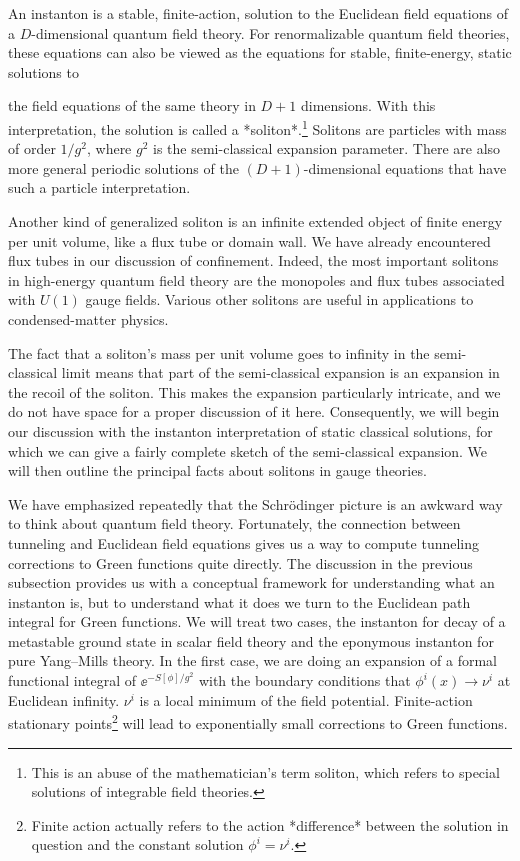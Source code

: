 An instanton is a stable, finite-action, solution to the Euclidean field
equations of a $D$-dimensional quantum field theory. For renormalizable quantum
field theories, these equations can also be viewed as the equations for stable,
finite-energy, static solutions to

the field equations of the same theory in $D+1$ dimensions. With this
interpretation, the solution is called a *soliton*.\footnote[5]{This is an
abuse of the mathematician's term soliton, which refers to special solutions of
integrable field theories.} Solitons are particles with mass of order $1/g^2$,
where $g^2$ is the semi-classical expansion parameter. There are also more
general periodic solutions of the $(D+1)$-dimensional equations that have such a
particle interpretation.

Another kind of generalized soliton is an infinite extended object of finite
energy per unit volume, like a flux tube or domain wall. We have already
encountered flux tubes in our discussion of confinement. Indeed, the most
important solitons in high-energy quantum field theory are the monopoles and
flux tubes associated with $U(1)$ gauge fields. Various other solitons are useful
in applications to condensed-matter physics.

The fact that a soliton's mass per unit volume goes to infinity in the
semi-classical limit means that part of the semi-classical expansion is an
expansion in the recoil of the soliton. This makes the expansion particularly
intricate, and we do not have space for a proper discussion of it here.
Consequently, we will begin our discussion with the instanton interpretation of
static classical solutions, for which we can give a fairly complete sketch of
the semi-classical expansion. We will then outline the principal facts about
solitons in gauge theories.

We have emphasized repeatedly that the Schrödinger picture is an awkward way to
think about quantum field theory. Fortunately, the connection between tunneling
and Euclidean field equations gives us a way to compute tunneling corrections to
Green functions quite directly. The discussion in the previous subsection
provides us with a conceptual framework for understanding what an instanton is,
but to understand what it does we turn to the Euclidean path integral for Green
functions. We will treat two cases, the instanton for decay of a metastable
ground state in scalar field theory and the eponymous instanton for pure
Yang--Mills theory. In the first case, we are doing an expansion of a formal
functional integral of $\ee^{-S[\phi]/g^2}$ with the boundary conditions that
$\phi^i(x)\to\nu^i$ at Euclidean infinity. $\nu^i$ is a local minimum of the
field potential. Finite-action stationary points\footnote[6]{Finite action
actually refers to the action *difference* between the solution in question and
the constant solution $\phi^i=\nu^i$.} will lead to exponentially small
corrections to Green functions.


